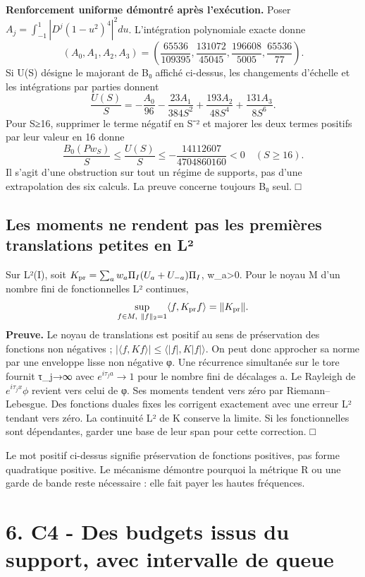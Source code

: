 \documentclass[
  10pt,
  a4paper,
]{article}
\begin{document}
\textbf{Renforcement uniforme démontré après l'exécution.} Poser
\(A_j=\int_{-1}^1|D^j(1-u^2)^4|^2du\). L'intégration polynomiale exacte
donne \[
(A_0,A_1,A_2,A_3)=
\left(\frac{65536}{109395},\frac{131072}{45045},
\frac{196608}{5005},\frac{65536}{77}\right).
\] Si U(S) désigne le majorant de B₀ affiché ci-dessus, les changements
d'échelle et les intégrations par parties donnent \[
\frac{U(S)}S=-\frac{A_0}{96}-\frac{23A_1}{384S^2}
+\frac{193A_2}{48S^4}+\frac{131A_3}{8S^6}.
\] Pour S≥16, supprimer le terme négatif en S⁻² et majorer les deux
termes positifs par leur valeur en 16 donne \[
\boxed{\frac{B_0(Pw_S)}S\le\frac{U(S)}S
\le-\frac{14112607}{4704860160}<0\quad(S\ge16).}
\] Il s'agit d'une obstruction sur tout un régime de supports, pas d'une
extrapolation des six calculs. La preuve concerne toujours B₀ seul. □

\hypertarget{les-moments-ne-rendent-pas-les-premiuxe8res-translations-petites-en-luxb2}{%
\subsection{Les moments ne rendent pas les premières translations
petites en
L²}\label{les-moments-ne-rendent-pas-les-premiuxe8res-translations-petites-en-luxb2}}

Sur L²(I), soit \(K_{\rm pr}=\sum_a w_a\Pi_I(U_a+U_{-a})\Pi_I\),
w\_a\textgreater0. Pour le noyau M d'un nombre fini de fonctionnelles L²
continues, \[
\sup_{f\in M,\ \|f\|_2=1}\langle f,K_{\rm pr}f\rangle=\|K_{\rm pr}\|.
\] \textbf{Preuve.} Le noyau de translations est positif au sens de
préservation des fonctions non négatives ;
\(|\langle f,Kf\rangle|\le\langle|f|,K|f|\rangle\). On peut donc
approcher sa norme par une enveloppe lisse non négative φ. Une
récurrence simultanée sur le tore fournit τ\_j→∞ avec
\(e^{i\tau_j a}\to1\) pour le nombre fini de décalages a. Le Rayleigh de
\(e^{i\tau_jx}\phi\) revient vers celui de φ. Ses moments tendent vers
zéro par Riemann--Lebesgue. Des fonctions duales fixes les corrigent
exactement avec une erreur L² tendant vers zéro. La continuité L² de K
conserve la limite. Si les fonctionnelles sont dépendantes, garder une
base de leur span pour cette correction. □

Le mot positif ci-dessus signifie préservation de fonctions positives,
pas forme quadratique positive. Le mécanisme démontre pourquoi la
métrique R ou une garde de bande reste nécessaire : elle fait payer les
hautes fréquences.

\hypertarget{c4---des-budgets-issus-du-support-avec-intervalle-de-queue}{%
\section{6. C4 - Des budgets issus du support, avec intervalle de
queue}\label{c4---des-budgets-issus-du-support-avec-intervalle-de-queue}}
\end{document}
